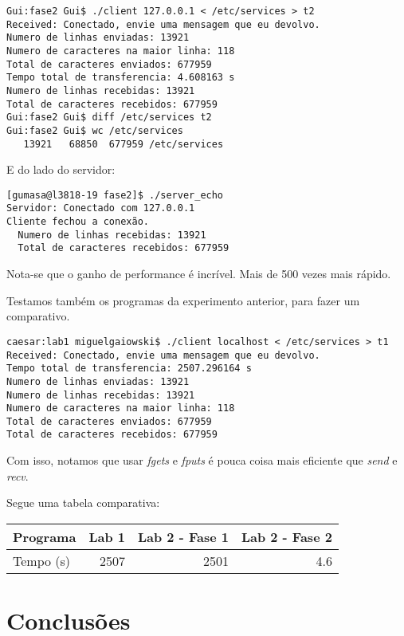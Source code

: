 \documentclass[12pt,a4paper]{article}
\begin{document}
\begin{verbatim}
Gui:fase2 Gui$ ./client 127.0.0.1 < /etc/services > t2
Received: Conectado, envie uma mensagem que eu devolvo.
Numero de linhas enviadas: 13921
Numero de caracteres na maior linha: 118
Total de caracteres enviados: 677959
Tempo total de transferencia: 4.608163 s
Numero de linhas recebidas: 13921
Total de caracteres recebidos: 677959
Gui:fase2 Gui$ diff /etc/services t2
Gui:fase2 Gui$ wc /etc/services 
   13921   68850  677959 /etc/services
\end{verbatim}

E do lado do servidor:

\begin{verbatim}
[gumasa@l3818-19 fase2]$ ./server_echo 
Servidor: Conectado com 127.0.0.1
Cliente fechou a conexão.
  Numero de linhas recebidas: 13921
  Total de caracteres recebidos: 677959
\end{verbatim}

Nota-se que o ganho de performance é incrível. Mais de 500 vezes mais
rápido.

Testamos também os programas da experimento anterior, para fazer um
comparativo.

\begin{verbatim}
caesar:lab1 miguelgaiowski$ ./client localhost < /etc/services > t1
Received: Conectado, envie uma mensagem que eu devolvo.
Tempo total de transferencia: 2507.296164 s
Numero de linhas enviadas: 13921
Numero de linhas recebidas: 13921
Numero de caracteres na maior linha: 118
Total de caracteres enviados: 677959
Total de caracteres recebidos: 677959
\end{verbatim}

Com isso, notamos que usar \textit{fgets} e \textit{fputs} é pouca
coisa mais eficiente que \textit{send} e \textit{recv}.

Segue uma tabela comparativa:

\begin{tabular}{|l|r|r|r|}
\hline
Programa & Lab 1 & Lab 2 - Fase 1 & Lab 2 - Fase 2  \\ \hline
Tempo (s) & 2507 & 2501 & 4.6 \\ \hline
\end{tabular}

\section{Conclusões}
\end{document}
